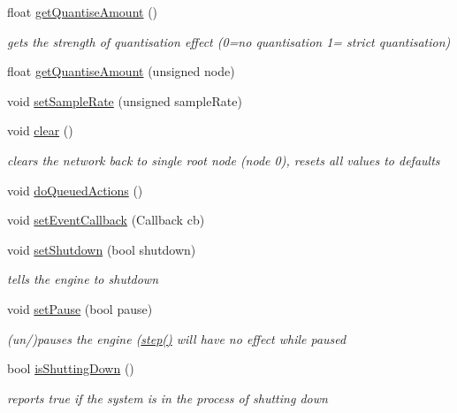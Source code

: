 \begin{DoxyCompactItemize}
\item 
float \mbox{\hyperlink{classMatsuokaEngine_aaf73c32f2c81d4895e98e1a8fe31cea1}{get\+Quantise\+Amount}} ()
\begin{DoxyCompactList}\small\item\em gets the strength of quantisation effect (0=no quantisation 1= strict quantisation) \end{DoxyCompactList}\item 
float \mbox{\hyperlink{classMatsuokaEngine_a8150c0efacb8f3d5ec2c3fb5731dfc97}{get\+Quantise\+Amount}} (unsigned node)
\item 
void \mbox{\hyperlink{classMatsuokaEngine_a23ee17f0e948af6fcccdaeefa2c4e246}{set\+Sample\+Rate}} (unsigned sample\+Rate)
\item 
void \mbox{\hyperlink{classMatsuokaEngine_a3bf65a238e682b78fee81cd13b49174d}{clear}} ()
\begin{DoxyCompactList}\small\item\em clears the network back to single root node (node 0), resets all values to defaults \end{DoxyCompactList}\item 
void \mbox{\hyperlink{classMatsuokaEngine_affd6ef89f68c1aa654229a07e0160f2e}{do\+Queued\+Actions}} ()
\item 
void \mbox{\hyperlink{classMatsuokaEngine_acaa099b8d5f49430d0fc84c16e0f4e67}{set\+Event\+Callback}} (Callback cb)
\item 
void \mbox{\hyperlink{classMatsuokaEngine_afca77a2464c5852a0dbb9eed2d191ecb}{set\+Shutdown}} (bool shutdown)
\begin{DoxyCompactList}\small\item\em tells the engine to shutdown \end{DoxyCompactList}\item 
void \mbox{\hyperlink{classMatsuokaEngine_a929ade3a9ce6497e47183190255cbfae}{set\+Pause}} (bool pause)
\begin{DoxyCompactList}\small\item\em (un/)pauses the engine (\mbox{\hyperlink{classMatsuokaEngine_a4fa468dc0814f1ad92594f7a4d5abd00}{step()}} will have no effect while paused \end{DoxyCompactList}\item 
bool \mbox{\hyperlink{classMatsuokaEngine_a5d7bb7f68eb7338a6c34eef10d421f68}{is\+Shutting\+Down}} ()
\begin{DoxyCompactList}\small\item\em reports true if the system is in the process of shutting down \end{DoxyCompactList}\item 

\end{DoxyCompactItemize}
